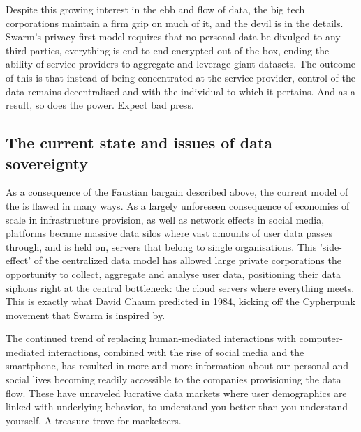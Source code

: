 Despite this growing interest in the ebb and flow of data, the big tech corporations maintain a firm grip on much of it, and the devil is in the details. Swarm's privacy-first model requires that no personal data be divulged to any third parties, everything is end-to-end encrypted out of the box, ending the ability of service providers to aggregate and leverage giant datasets. The outcome of this is that instead of being concentrated at the service provider, control of the data remains decentralised and with the individual to which it pertains. And as a result, so does the power. Expect bad press.

\subsection{The current state and issues of data sovereignty \statusgreen }\label{sec:data-sovereignty}

As a consequence of the Faustian bargain described above, the current model of the  is flawed in many ways. As a largely unforeseen consequence of economies of scale in infrastructure provision, as well as network effects in social media, platforms became massive data silos where vast amounts of user data passes through, and is held on, servers that belong to single organisations. This 'side-effect' of the centralized data model has allowed large private corporations the opportunity to collect, aggregate and analyse user data, positioning their data siphons right at the central bottleneck: the cloud servers where everything meets. This is exactly what David Chaum predicted in 1984, kicking off the Cypherpunk movement that Swarm is inspired by.

The continued trend of replacing human-mediated interactions with computer-mediated interactions, combined with the rise of social media and the smartphone, has resulted in more and more information about our personal and social lives becoming readily accessible to the companies provisioning the data flow. These have unraveled lucrative data markets where user demographics are linked with underlying behavior, to understand you better than you understand yourself. A treasure trove for marketeers.

